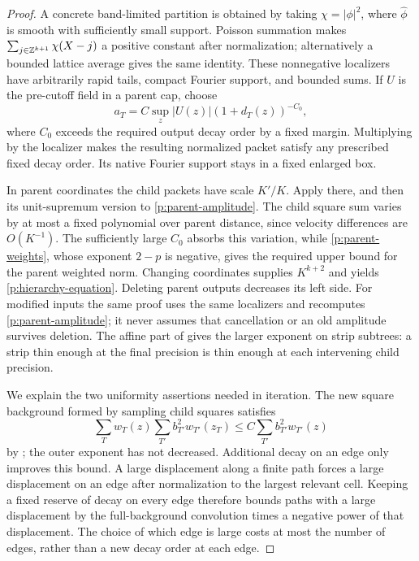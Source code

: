 \begin{proof}
A concrete band-limited partition is obtained by taking $\chi=|\phi|^2$,
where $\widehat\phi$ is smooth with sufficiently small support.  Poisson
summation makes $\sum_{j\in\mathbb Z^{k+1}}\chi(X-j)$ a positive constant after
normalization; alternatively a bounded lattice average gives the same
identity.  These nonnegative localizers have arbitrarily rapid tails,
compact Fourier support, and bounded sums.  If $U$ is the pre-cutoff field
in a parent cap, choose
\begin{equation}\label{p:parent-amplitude}
 a_T=C\sup_z |U(z)|(1+d_T(z))^{-C_0},
\end{equation}
where $C_0$ exceeds the required output decay order by a fixed margin.
Multiplying by the localizer makes the resulting normalized packet satisfy
any prescribed fixed decay order.  Its native Fourier support stays in a
fixed enlarged box.

In parent coordinates the child packets have scale $K'/K$.  Apply
 there, and then its unit-supremum version to
\eqref{p:parent-amplitude}.  The child square sum varies by at most a fixed
polynomial over parent distance, since velocity differences are $O(K^{-1})$.
The sufficiently large $C_0$ absorbs this variation, while
\eqref{p:parent-weights}, whose exponent $2-p$ is negative, gives the required
upper bound for the parent weighted norm.  Changing coordinates supplies
$K^{k+2}$ and yields \eqref{p:hierarchy-equation}.
Deleting parent outputs decreases its left side.  For modified inputs the
same proof uses the same localizers and recomputes \eqref{p:parent-amplitude};
it never assumes that cancellation or an old amplitude survives deletion.
The affine part of  gives the larger exponent on strip
subtrees: a strip thin enough at the final precision is thin enough at each
intervening child precision.

We explain the two uniformity assertions needed in iteration.  The new
square background formed by sampling child squares satisfies
\[
 \sum_Tw_T(z)\sum_{T'}b_{T'}^2w_{T'}(z_T)
 \leq C\sum_{T'}b_{T'}^2w_{T'}(z)
\]
by ; the outer exponent has not decreased.
Additional decay on an edge only improves this bound.  A large displacement
along a finite path forces a large displacement on an edge after normalization
to the largest relevant cell.  Keeping a fixed reserve of decay on every edge
therefore bounds paths with a large displacement by the full-background
convolution times a negative power of that displacement.  The choice of
which edge is large costs at most the number of edges, rather than a new
decay order at each edge.


\end{proof}
